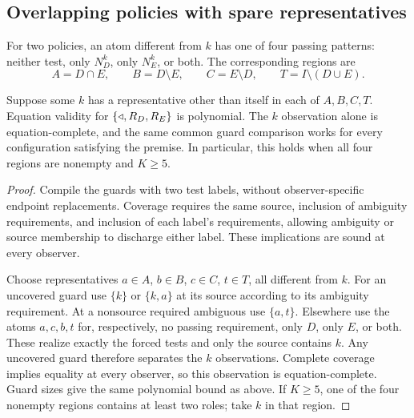 \subsection{Overlapping policies with spare representatives}

For two policies, an atom different from $k$ has one of four passing
patterns: neither test, only $N_D^k$, only $N_E^k$, or both. The
corresponding regions are
\[
 A=D\cap E,\qquad B=D\setminus E,\qquad
 C=E\setminus D,\qquad T=I\setminus(D\cup E).
\]

\begin{theorem}\label{selective:thm:patterns}
Suppose some $k$ has a representative other than itself in each of
$A,B,C,T$. Equation validity for $\{\mathbin{\triangleleft},R_D,R_E\}$ is polynomial.
The $k$ observation alone is equation-complete, and the same common
guard comparison works for every configuration satisfying the premise.
In particular, this holds when all four regions are nonempty and
$K\geq5$.
\end{theorem}
\begin{proof}
Compile the guards with two test labels, without observer-specific
endpoint replacements. Coverage requires the same source, inclusion
of ambiguity requirements, and inclusion of each label's requirements,
allowing ambiguity or source membership to discharge either label.
These implications are sound at every observer.

Choose representatives $a\in A$, $b\in B$, $c\in C$, $t\in T$,
all different from $k$. For an uncovered guard use $\{k\}$ or
$\{k,a\}$ at its source according to its ambiguity requirement.
At a nonsource required ambiguous use $\{a,t\}$. Elsewhere use the
atoms $a,c,b,t$ for, respectively, no passing requirement, only $D$,
only $E$, or both. These realize exactly the forced tests and only the
source contains $k$. Any uncovered guard therefore separates the
$k$ observations. Complete coverage implies equality at every observer,
so this observation is equation-complete. Guard sizes give the same
polynomial bound as above. If $K\geq5$, one of the four nonempty
regions contains at least two roles; take $k$ in that region.
\end{proof}

